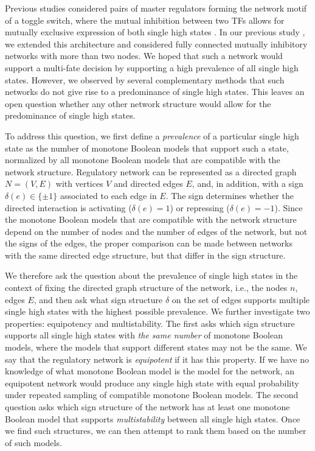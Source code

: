 \documentclass[12pt]{amsart}
\theoremstyle{definition}
\begin{document}
Previous studies considered pairs of master regulators forming the network motif of a toggle switch, where the mutual inhibition between two TFs allows for mutually exclusive expression of both single high states \cite{gardner_construction_2000,tian_stochastic_2006}. In our previous study \cite{bv_emergent_2025}, we extended this architecture and considered fully connected mutually inhibitory networks with more than two nodes. We hoped that such a network would support a multi-fate decision by supporting a high prevalence of all single high states. However, we observed by several complementary methods that such networks do not give rise to a predominance of single high states. This leaves an open question whether any other network structure would allow for the predominance of single high states. 

To address this question, we first define a \textit{ prevalence} of a particular single high state as the number of monotone Boolean models that support such a state, normalized by all monotone Boolean models that are compatible with the network structure. Regulatory network can be represented as a directed graph $N=(V, E)$ with vertices $V$ and directed edges $E$, and, in addition, with a sign $\delta(e)\in \{\pm 1\}$ associated to each edge in $E$. The sign determines whether the directed interaction is activating ($\delta(e) = 1$) or repressing ($\delta(e) = -1$). Since the monotone Boolean models that are compatible with the network structure depend on the number of nodes and the number of edges of the network, but not the signs of the edges, the proper comparison can be made between networks with the same directed edge structure, but that differ in the sign structure. 

We therefore ask the question about the prevalence of single high states in the context of fixing the directed graph structure of the network, i.e., the nodes $n$, edges $E$, and then ask what sign structure $\delta$ on the set of edges supports multiple single high states with the highest possible prevalence. We further investigate two properties: equipotency and multistability. The first asks which sign structure supports all single high states with \textit{ the same number} of monotone Boolean models, where the models that support different states may not be the same. We say that the regulatory network is \textit{equipotent} if it has this property. If we have no knowledge of what monotone Boolean model is the model for the network, an equipotent network would produce any single high state with equal probability under repeated sampling of compatible monotone Boolean models. The second question asks which sign structure of the network has at least one monotone Boolean model that supports \textit{ multistability} between all single high states. Once we find such structures, we can then attempt to rank them based on the number of such models. 
\end{document}
